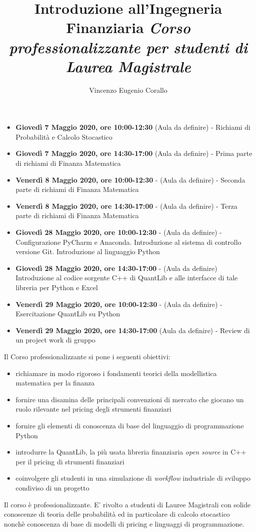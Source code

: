 \documentclass[]{article}
\title{\textbf{Introduzione all'Ingegneria Finanziaria} 
	\newline
\textit{Corso professionalizzante per studenti di Laurea Magistrale}}
\author{Vincenzo Eugenio Corallo}
\date{}
\begin{document}
\maketitle

%

\begin{itemize}
	\item \textbf{Giovedì 7 Maggio 2020, ore 10:00-12:30} (Aula da definire) - Richiami di Probabilità e Calcolo Stocastico  
	
	\item \textbf{Giovedì 7 Maggio 2020, ore 14:30-17:00} (Aula da definire) - Prima parte di richiami di Finanza Matematica
	
	\item \textbf{Venerdì 8 Maggio 2020, ore 10:00-12:30} - (Aula da definire) - Seconda parte di richiami di Finanza Matematica
		
	\item \textbf{Venerdì 8 Maggio 2020, ore 14:30-17:00} - (Aula da definire) - Terza parte di richiami di Finanza Matematica
	
	\item \textbf{Giovedì 28 Maggio 2020, ore 10:00-12:30} - (Aula da definire) -  Configurazione PyCharm e Anaconda. Introduzione al sistema di controllo versione Git. Introduzione al linguaggio Python
	 
	\item \textbf{Giovedì 28 Maggio 2020, ore 14:30-17:00} - (Aula da definire) Introduzione al codice sorgente C++ di QuantLib e alle interfacce di tale libreria per Python e Excel
	 
	\item \textbf{Venerdì 29 Maggio 2020, ore 10:00-12:30} - (Aula da definire) - Esercitazione QuantLib su Python
	
	\item \textbf{Venerdì 29 Maggio 2020, ore 14:30-17:00} (Aula da definire) - Review di un project work di gruppo
	
\end{itemize}
	Il Corso professionalizzante si pone i seguenti obiettivi:
	\begin{itemize}
		\item richiamare in modo rigoroso i fondamenti teorici della modellistica matematica per la finanza
		\item fornire una disamina delle principali convenzioni di mercato che giocano un ruolo rilevante nel pricing degli strumenti finanziari
		\item fornire gli elementi di conoscenza di base del linguaggio di programmazione Python
		
		\item introdurre la QuantLib, la più usata libreria finanziaria \textit{open source} in C++ per il pricing di strumenti finanziari
		\item coinvolgere gli studenti in una simulazione di  \textit{workflow} industriale di sviluppo condiviso di un progetto
	\end{itemize}

	Il corso è professionalizzante. E’ rivolto a studenti di Lauree Magistrali con solide conoscenze di teoria delle probabilità ed in particolare di calcolo stocastico nonchè conoscenza di base di modelli di pricing e linguaggi di programmazione.
\end{document}
